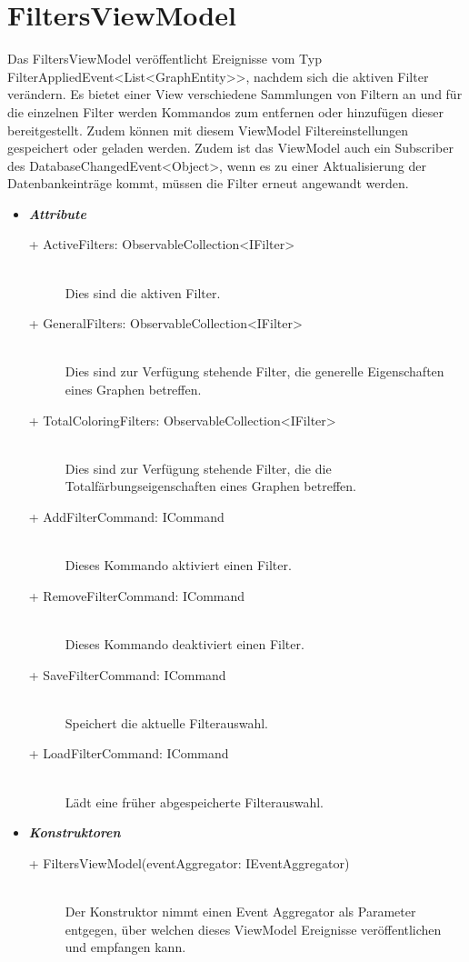 \documentclass[13pt]{scrreprt}
\begin{document}
	\section{FiltersViewModel}
	Das FiltersViewModel ver\"offentlicht Ereignisse vom Typ \\FilterAppliedEvent<List<GraphEntity>>, nachdem sich die aktiven Filter ver\"andern. Es bietet einer View verschiedene Sammlungen von Filtern an und f\"ur die einzelnen Filter werden Kommandos zum entfernen oder hinzuf\"ugen dieser bereitgestellt. Zudem k\"onnen mit diesem ViewModel Filtereinstellungen gespeichert oder geladen werden. Zudem ist das ViewModel auch ein Subscriber des DatabaseChangedEvent<Object>, wenn es zu einer Aktualisierung der Datenbankeintr\"age kommt, m\"ussen die Filter erneut angewandt werden.
	\begin{itemize}[label = {$\circ$}]
		\item {\large \textbf{\textit{Attribute}}\par}
		\begin{description}
			\item [+ ActiveFilters: ObservableCollection<IFilter>] \hfill \\Dies sind die aktiven Filter.
			\item [+ GeneralFilters: ObservableCollection<IFilter>] \hfill \\ Dies sind zur Verf\"ugung stehende Filter, die generelle Eigenschaften eines Graphen betreffen.
			\item [+ TotalColoringFilters: ObservableCollection<IFilter>] \hfill \\Dies sind zur Verf\"ugung stehende Filter, die die Totalf\"arbungseigenschaften eines Graphen betreffen.
			\item [+ AddFilterCommand: ICommand] \hfill \\ Dieses Kommando aktiviert einen Filter.
			\item [+ RemoveFilterCommand: ICommand] \hfill \\ Dieses Kommando deaktiviert einen Filter.
			\item [+ SaveFilterCommand: ICommand] \hfill \\ Speichert die aktuelle Filterauswahl.
			\item [+ LoadFilterCommand: ICommand] \hfill \\ L\"adt eine fr\"uher abgespeicherte Filterauswahl.
		\end{description}
		\item {\large \textbf{\textit{Konstruktoren}}\par}
		\begin{description}
			\item [+  FiltersViewModel(eventAggregator: IEventAggregator)] \hfill \\ Der Konstruktor nimmt einen Event Aggregator als Parameter entgegen, über welchen dieses ViewModel Ereignisse ver\"offentlichen und empfangen kann.
		\end{description}
	\end{itemize}
	
\end{document}
